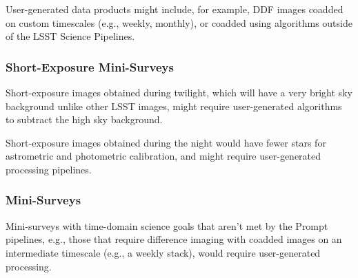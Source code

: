 User-generated data products might include, for example, DDF images coadded on custom 
timescales (e.g., weekly, monthly), or coadded using algorithms outside of the LSST 
Science Pipelines.


\subsubsection{Short-Exposure Mini-Surveys}

Short-exposure images obtained during twilight, which will have a very bright sky 
background unlike other LSST images, might require user-generated algorithms to 
subtract the high sky background. 

Short-exposure images obtained during the night would have fewer stars for 
astrometric and photometric calibration, and might require user-generated 
processing pipelines.


\subsubsection{Mini-Surveys}

Mini-surveys with time-domain science goals that aren't met by the Prompt pipelines, 
e.g., those that require difference imaging with coadded images on an intermediate 
timescale (e.g., a weekly stack), would require user-generated processing.
